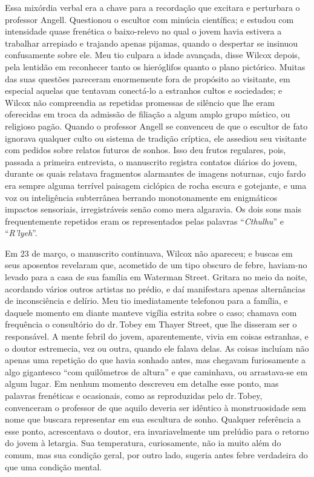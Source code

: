 Essa mixórdia verbal era a chave para a recordação que excitara e
perturbara o professor Angell. Questionou o escultor com minúcia
científica; e estudou com intensidade quase frenética o baixo-relevo no
qual o jovem havia estivera a trabalhar arrepiado e trajando apenas 
pijamas, quando o despertar se insinuou confusamente sobre ele. Meu
tio culpara a idade avançada, disse Wilcox depois, pela lentidão em
reconhecer tanto os hieróglifos quanto o plano pictórico. Muitas das
suas questões pareceram enormemente fora de propósito ao visitante, em
especial aquelas que tentavam conectá-lo a estranhos cultos e
sociedades; e Wilcox não compreendia as repetidas promessas de silêncio
que lhe eram oferecidas em troca da admissão de filiação a algum amplo
grupo místico, ou religioso pagão. Quando o professor Angell se
convenceu de que o escultor de fato ignorava qualquer culto ou sistema
de tradição críptica, ele assediou seu visitante com pedidos
sobre
relatos futuros de sonhos. Isso deu frutos regulares, pois, passada a
primeira entrevista, o manuscrito registra contatos diários do jovem,
durante os quais relatava fragmentos alarmantes de imagens noturnas,
cujo fardo era sempre alguma terrível paisagem ciclópica de rocha escura
e gotejante, e uma voz ou inteligência subterrânea berrando
monotonamente em enigmáticos impactos sensoriais, irregistráveis senão
como mera algaravia. Os dois sons mais frequentemente repetidos eram os
representados pelas palavras ``\emph{Cthulhu}'' e ``\emph{R'lyeh}''.

Em 23 de março, o manuscrito continuava, Wilcox não apareceu; e buscas em
seus aposentos revelaram que, acometido de um tipo obscuro de febre, 
haviam-no levado para a casa de sua família em Waterman Street. Gritara no
meio da noite, acordando vários outros artistas no prédio, e daí
manifestara apenas alternâncias de inconsciência e delírio. Meu tio
imediatamente telefonou para a família, e daquele momento em diante
manteve vigília estrita sobre o caso; chamava com frequência o
consultório do dr.\,Tobey em Thayer Street, que lhe disseram ser o
responsável. A mente febril do jovem, aparentemente, vivia em coisas
estranhas, e o doutor estremecia, vez ou outra, quando ele falava delas.
As coisas incluíam não apenas uma repetição do que havia sonhado antes,
mas chegavam furiosamente a algo gigantesco ``com quilômetros de altura'' e
que caminhava, ou arrastava-se em algum lugar. Em nenhum momento
descreveu em detalhe esse ponto, mas palavras frenéticas e ocasionais,
como as reproduzidas pelo dr.\,Tobey, convenceram o professor de que
aquilo deveria ser idêntico à monstruosidade sem nome que buscara
representar em sua escultura de sonho. Qualquer referência a esse ponto,
acrescentava o doutor, era invariavelmente um prelúdio para o retorno do
jovem à letargia. Sua temperatura, curiosamente, não ia muito além do
comum, mas sua condição geral, por outro lado, sugeria antes febre
verdadeira do que uma condição mental.

